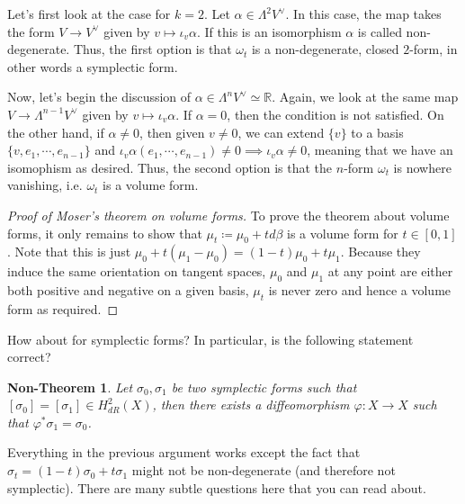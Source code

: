\documentclass[12pt]{amsart}
\newtheorem{non-theorem}{Non-Theorem}
\newcommand{\R}{\mathbb{R}} %
\theoremstyle{remark}
\begin{document}
Let's first look at the case for $k=2$. Let $\alpha\in \Lambda^2 V^\vee$. In this case, the map takes the form $V\to V^\vee$ given by $v\mapsto \iota_v\alpha$. If this is an isomorphism $\alpha$ is called non-degenerate. Thus, the first option is that $\omega_t$ is a non-degenerate, closed $2$-form, in other words a symplectic form. 

Now, let's begin the discussion of $\alpha \in \Lambda^nV^\vee \simeq \R$. Again, we look at the same map $V\to \Lambda^{n-1}V^\vee$ given by $v\mapsto \iota_v\alpha$. If $\alpha=0$, then the condition is not satisfied. On the other hand, if $\alpha\neq 0$, then given $v\neq 0$, we can extend $\{v\}$ to a basis $\{v,e_1,\cdots,e_{n-1}\}$ and $\iota_v\alpha(e_1,\cdots,e_{n-1})\neq0\implies \iota_v\alpha\neq 0$, meaning that we have an isomophism as desired. Thus, the second option is that the $n$-form $\omega_t$ is nowhere vanishing, i.e. $\omega_t$ is a volume form.

\begin{proof}[Proof of Moser's theorem on volume forms] To prove the theorem about volume forms, it only remains to show that $\mu_t\coloneqq \mu_0+td\beta$ is a volume form for $t\in [0,1]$. Note that this is just $\mu_0+t(\mu_1-\mu_0)=(1-t)\mu_0+t\mu_1$. Because they induce the same orientation on tangent spaces, $\mu_0$ and $\mu_1$ at any point are either both positive and negative on a given basis, $\mu_t$ is never zero and hence a volume form as required.
\end{proof}
How about for symplectic forms? In particular, is the following statement correct?
\begin{non-theorem}
Let $\sigma_0,\sigma_1$ be two symplectic forms such that $\left[\sigma_0\right]=\left[\sigma_1\right] \in H^2_{dR}(X)$, then there exists a diffeomorphism $\varphi:X\to X$ such that $\varphi^*\sigma_1=\sigma_0$. 
\end{non-theorem}
Everything in the previous argument works except the fact that $\sigma_t=(1-t)\sigma_0+t\sigma_1$ might not be non-degenerate (and therefore not symplectic). There are many subtle questions here that you can read about.
\end{document}
